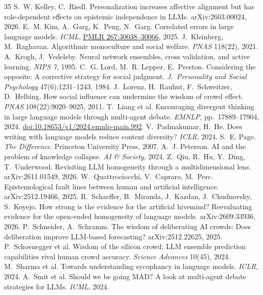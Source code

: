 \documentclass[10pt]{article}
\theoremstyle{manuscript}\newtheorem{proposition}{Proposition}
\begin{document}
\begin{thebibliography}{35}
 S.~W. Kelley, C.~Riedl. Personalization increases affective alignment but has role-dependent effects on epistemic independence in LLMs. arXiv:2603.00024, 2026.
 E.~M. Kim, A.~Garg, K.~Peng, N.~Garg. Correlated errors in large language models. \emph{ICML}, \href{https://proceedings.mlr.press/v267/kim25e.html}{PMLR 267:30038--30066}, 2025.
 J.~Kleinberg, M.~Raghavan. Algorithmic monoculture and social welfare. \emph{PNAS} 118(22), 2021.
 A.~Krogh, J.~Vedelsby. Neural network ensembles, cross validation, and active learning. \emph{NIPS 7}, 1995.
 C.~G. Lord, M.~R. Lepper, E.~Preston. Considering the opposite: A corrective strategy for social judgment. \emph{J.\ Personality and Social Psychology} 47(6):1231--1243, 1984.
 J.~Lorenz, H.~Rauhut, F.~Schweitzer, D.~Helbing. How social influence can undermine the wisdom of crowd effect. \emph{PNAS} 108(22):9020--9025, 2011.
 T.~Liang et al. Encouraging divergent thinking in large language models through multi-agent debate. \emph{EMNLP}, pp.~17889--17904, 2024. \href{https://aclanthology.org/2024.emnlp-main.992/}{doi:10.18653/v1/2024.emnlp-main.992}.
 V.~Padmakumar, H.~He. Does writing with language models reduce content diversity? \emph{ICLR}, 2024.
 S.~E. Page. \emph{The Difference}. Princeton University Press, 2007.
 A.~J. Peterson. AI and the problem of knowledge collapse. \emph{AI \& Society}, 2024.
 Z.~Qiu, R.~Hu, Y.~Ding, T.~Underwood. Revisiting LLM homogeneity through a multidimensional lens. arXiv:2611.01549, 2026.
 W.~Quattrociocchi, V.~Capraro, M.~Perc. Epistemological fault lines between human and artificial intelligence. arXiv:2512.19466, 2025.
 R.~Schaeffer, B.~Miranda, J.~Kazdan, J.~Chudnovsky, S.~Koyejo. How strong is the evidence for the artificial hivemind? Reevaluating evidence for the open-ended homogeneity of language models. arXiv:2609.33936, 2026.
 P.~Schneider, A.~Schramm. The wisdom of deliberating AI crowds: Does deliberation improve LLM-based forecasting? arXiv:2512.22625, 2025.
 P.~Schoenegger et al. Wisdom of the silicon crowd: LLM ensemble prediction capabilities rival human crowd accuracy. \emph{Science Advances} 10(45), 2024.
 M.~Sharma et al. Towards understanding sycophancy in language models. \emph{ICLR}, 2024.
 A.~Smit et al. Should we be going MAD? A look at multi-agent debate strategies for LLMs. \emph{ICML}, 2024.

\end{thebibliography}
\end{document}
